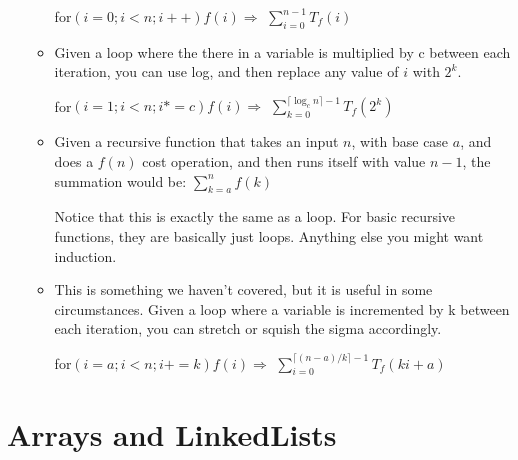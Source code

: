 \documentclass{article}
\begin{document}
\begin{itemize}
\begin{itemize}
    			for$(i = 0; i < n; i++) f(i) \Rightarrow$
    			$\sum_{i=0}^{n-1} T_f(i)$
    		\item
    			Given a loop where the there in a variable is multiplied by c between each iteration, you can use log, and then replace any value of $i$ with $2^k$.
    			
    			for$(i = 1; i < n; i *= c) f(i) \Rightarrow$
    			$\sum_{k=0}^{\lceil \log_c n \rceil - 1} T_f(2^k)$
    		\item
    			Given a recursive function that takes an input $n$, with base case $a$, and does a $f(n)$ cost operation, and then runs itself with value $n-1$, the summation would be:
    			$\sum_{k=a}^{n} f(k)$
    			
    			Notice that this is exactly the same as a loop. For basic recursive functions, they are basically just loops. Anything else you might want induction.
    		\item
    			This is something we haven't covered, but it is useful in some circumstances.
    			Given a loop where a variable is incremented by k between each iteration, you can stretch or squish the sigma accordingly.
    			
    			for$(i = a; i < n; i += k) f(i) \Rightarrow$
    			$\sum_{i=0}^{\lceil(n-a)/k \rceil - 1} T_f(ki + a)$
    	\end{itemize}
\end{itemize}


\section{Arrays and LinkedLists}
\end{document}
